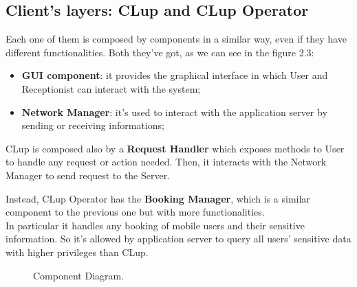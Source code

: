 \subsection{Client's layers: CLup and CLup Operator}
Each one of them is composed by components in a similar way, even if they have different functionalities.
Both they've got, as we can see in the figure 2.3:
\begin{itemize} 
\item \textbf{GUI component}: it provides the graphical interface in which User and Receptionist can interact with the system;
\item \textbf{Network Manager}: it's used to interact with the application server by sending or receiving informations; 
\end{itemize}


CLup is composed also by a \textbf{Request Handler} which exposes methods to User to handle any request or action needed. Then, it interacts with the Network Manager to send request to the Server. \par
Instead, CLup Operator has the \textbf{Booking Manager}, which is a similar component to the previous one but with more functionalities.\\
In particular it handles any booking of mobile users and their sensitive information. So it's allowed by application server to query all users' sensitive data with higher privileges than CLup. \par




\begin{figure}[H]
  \centering
    \caption{Component Diagram.}
      \label{component_diagram}

\end{figure}

